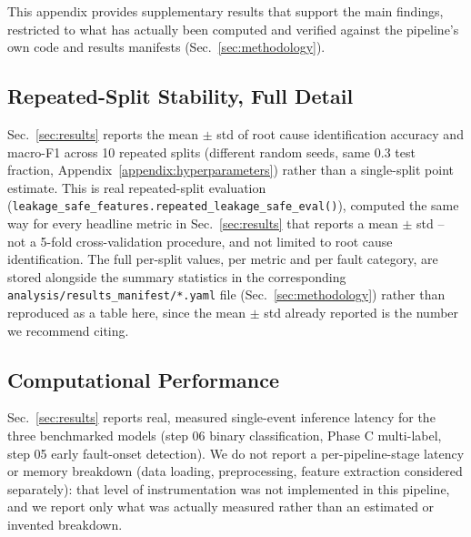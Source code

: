 
This appendix provides supplementary results that support the main findings, restricted to what has actually been computed and verified against the pipeline's own code and results manifests (Sec.~\ref{sec:methodology}).


\subsection{Repeated-Split Stability, Full Detail}

Sec.~\ref{sec:results} reports the mean $\pm$ std of root cause identification accuracy and macro-F1 across 10 repeated splits (different random seeds, same 0.3 test fraction, Appendix~\ref{appendix:hyperparameters}) %
rather than a single-split point estimate. This is real repeated-split evaluation (\texttt{leakage\_safe\_features.repeated\_leakage\_safe\_eval()}), computed the same way for every headline metric in Sec.~\ref{sec:results} that reports a mean $\pm$ std -- not a 5-fold cross-validation procedure, and not limited to root cause identification. The full per-split values, per metric and per fault category, are stored alongside the summary statistics in the corresponding \texttt{analysis/results\_manifest/*.yaml} file (Sec.~\ref{sec:methodology}) rather than reproduced as a table here, since the mean $\pm$ std already reported is the number we recommend citing. %

\subsection{Computational Performance}

Sec.~\ref{sec:results} reports real, measured single-event inference latency for the three benchmarked models (step 06 binary classification, Phase C multi-label, step 05 early fault-onset detection). %
We do not report a per-pipeline-stage latency or memory breakdown (data loading, preprocessing, feature extraction considered separately): that level of instrumentation was not implemented in this pipeline, and we report only what was actually measured rather than an estimated or invented breakdown.
